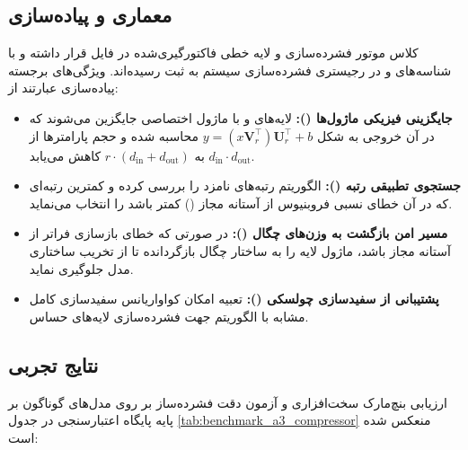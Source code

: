 \subsection{معماری و پیاده‌سازی}
کلاس موتور فشرده‌سازی  و لایه خطی فاکتورگیری‌شده  در فایل  قرار داشته و با شناسه‌های  و  در رجیستری فشرده‌سازی سیستم به ثبت رسیده‌اند. ویژگی‌های برجسته پیاده‌سازی عبارتند از:
\begin{itemize}
    \item \textbf{جایگزینی فیزیکی ماژول‌ها ():} لایه‌های  و  با ماژول اختصاصی  جایگزین می‌شوند که در آن خروجی به شکل $y = (x \mathbf{V}_r^\top)\mathbf{U}_r^\top + b$ محاسبه شده و حجم پارامترها از $d_{\text{in}} \cdot d_{\text{out}}$ به $r \cdot (d_{\text{in}} + d_{\text{out}})$ کاهش می‌یابد.
    \item \textbf{جستجوی تطبیقی رتبه ():} الگوریتم رتبه‌های نامزد را بررسی کرده و کمترین رتبه‌ای که در آن خطای نسبی فروبنیوس از آستانه مجاز () کمتر باشد را انتخاب می‌نماید.
    \item \textbf{مسیر امن بازگشت به وزن‌های چگال ():} در صورتی که خطای بازسازی فراتر از آستانه مجاز باشد، ماژول لایه را به ساختار چگال بازگردانده تا از تخریب ساختاری مدل جلوگیری نماید.
    \item \textbf{پشتیبانی از سفیدسازی چولسکی ():} تعبیه امکان کواواریانس سفیدسازی کامل مشابه با الگوریتم  جهت فشرده‌سازی لایه‌های حساس.
\end{itemize}

\subsection{نتایج تجربی}
ارزیابی بنچ‌مارک سخت‌افزاری و آزمون دقت فشرده‌ساز  بر روی مدل‌های گوناگون بر پایه پایگاه اعتبارسنجی  در جدول \ref{tab:benchmark_a3_compressor} منعکس شده است:

